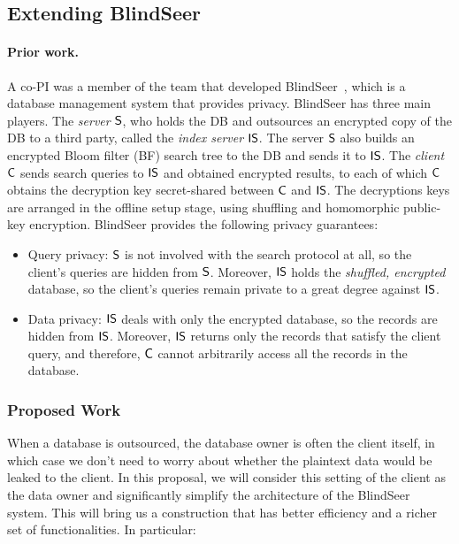 
\subsection{Extending BlindSeer}
\label{sec:ext-blindseer}

\paragraph{Prior work.} A co-PI was a member of the team that developed
BlindSeer~\cite{SP:PKVKMC14,SP:FVKKKM15}, which is a database management system
that provides privacy.
%
BlindSeer has three main players. The {\em server} $\sf S$,
who holds the DB and outsources an encrypted copy of the DB to a third party,
called the {\em index server} $\sf IS$. The server $\sf S$  also builds an
encrypted Bloom filter (BF) search tree to the DB and sends it to $\sf IS$. The
{\em client} $\sf C$ sends search queries to $\sf IS$ and obtained encrypted
results, to each of which $\sf C$ obtains the decryption key secret-shared
between $\sf C$ and $\sf IS$. The decryptions keys are arranged in the offline
setup stage, using shuffling and homomorphic public-key
encryption.
%
BlindSeer provides the following privacy guarantees:
\begin{itemize}\setlength\itemsep{0em}
\item Query privacy: $\sf S$ is not involved with the search protocol at
  all, so the client's queries are hidden from $\sf S$. Moreover, $\sf IS$ holds
    the {\em shuffled, encrypted} database, so the client's queries remain
    private to a great degree against $\sf IS$. 

\item Data privacy: $\sf IS$ deals with only the encrypted database, so the
records are hidden from $\sf IS$. Moreover, $\sf IS$ returns only the records
that satisfy the client query, and therefore, $\sf C$ cannot arbitrarily access
all the records in the database.  
\end{itemize}

\subsubsection{Proposed Work}
When a database is outsourced, the database owner is often the client
itself, in which case we don't need to worry about whether the plaintext data
would be leaked to the client.  In this proposal, we will consider this setting
of the client as the data owner and significantly simplify the architecture of
the BlindSeer system. This will bring us a construction that has better
efficiency and a richer set of functionalities. In particular:


